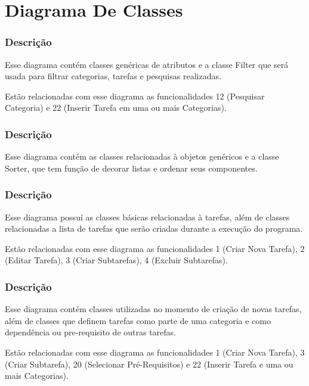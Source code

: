 \part{Diagrama De Classes}

\section{Descrição}
	Esse diagrama contém classes genéricas de atributos e a classe Filter que será usada para filtrar categorias, tarefas e pesquisas realizadas.

	Estão relacionadas com esse diagrama as funcionalidades 12 (Pesquisar Categoria) e 22 (Inserir Tarefa em uma ou mais Categorias).

\section{Descrição}
	Esse diagrama contém as classes relacionadas à objetos genéricos e a classe Sorter, que tem função de decorar listas e ordenar seus componentes. 

\section{Descrição}
	Esse diagrama possuí as classes básicas relacionadas à tarefas, além de classes relacionadas a lista de tarefas que serão criadas durante a execução do programa. 
	
	Estão relacionadas com esse diagrama as funcionalidades 1 (Criar Nova Tarefa), 2 (Editar Tarefa), 3 (Criar Subtarefas), 4 (Excluir Subtarefas). 

\section{Descrição}
	Esse diagrama contém classes utilizadas no momento de criação de novas tarefas, além de classes que definem tarefas como parte de uma categoria e como dependência ou pre-requisito de outras tarefas. 
	
	Estão relacionadas com esse diagrama as funcionalidades 1 (Criar Nova Tarefa), 3 (Criar Subtarefa), 20 (Selecionar Pré-Requisitos) e 22 (Inserir Tarefa e uma ou mais Categorias).

